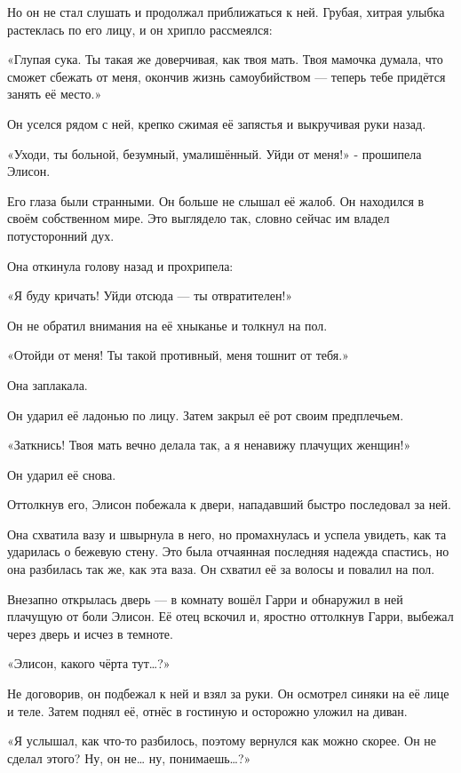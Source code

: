 \documentclass[a4paper,12pt]{book}
\begin{document}
\par
Но он не стал слушать и продолжал приближаться к ней. Грубая, хитрая улыбка растеклась по его лицу, и он хрипло рассмеялся:
\par
«Глупая сука. Ты такая же доверчивая, как твоя мать. Твоя мамочка думала, что сможет сбежать от меня, окончив жизнь самоубийством — теперь тебе придётся занять её место.»
\par
Он уселся рядом с ней, крепко сжимая её запястья и выкручивая руки назад.
\par
«Уходи, ты больной, безумный, умалишённый. Уйди от меня!» - прошипела Элисон.
\par
Его глаза были странными. Он больше не слышал её жалоб. Он находился в своём собственном мире. Это выглядело так, словно сейчас им владел потусторонний дух.
\par
Она откинула голову назад и прохрипела:
\par
«Я буду кричать! Уйди отсюда — ты отвратителен!»
\par
Он не обратил внимания на её хныканье и толкнул на пол.
\par
«Отойди от меня! Ты такой противный, меня тошнит от тебя.»
\par
Она заплакала.
\par
Он ударил её ладонью по лицу. Затем закрыл её рот своим предплечьем.
\par
«Заткнись! Твоя мать вечно делала так, а я ненавижу плачущих женщин!»
\par
Он ударил её снова.
\par
Оттолкнув его, Элисон побежала к двери, нападавший быстро последовал за ней.
\par
Она схватила вазу и швырнула в него, но промахнулась и успела увидеть, как та ударилась о бежевую стену. Это была отчаянная последняя надежда спастись, но она разбилась так же, как эта ваза. Он схватил её за волосы и повалил на пол.\\
\par
Внезапно открылась дверь — в комнату вошёл Гарри и обнаружил в ней плачущую от боли Элисон. Её отец вскочил и, яростно оттолкнув Гарри, выбежал через дверь и исчез в темноте.
\par
«Элисон, какого чёрта тут…?»
\par
Не договорив, он подбежал к ней и взял за руки. Он осмотрел синяки на её лице и теле. Затем поднял её, отнёс в гостиную и осторожно уложил на диван.
\par
«Я услышал, как что-то разбилось, поэтому вернулся как можно скорее. Он не сделал этого? Ну, он не… ну, понимаешь…?»
\end{document}
